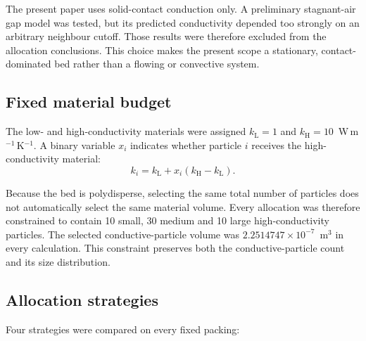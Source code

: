 \documentclass[12pt,a4paper]{article}
\begin{document}
	The present paper uses solid-contact conduction only. A preliminary stagnant-air
	gap model was tested, but its predicted conductivity depended too strongly on
	an arbitrary neighbour cutoff. Those results were therefore excluded from the
	allocation conclusions. This choice makes the present scope a stationary,
	contact-dominated bed rather than a flowing or convective system.
	
	\subsection{Fixed material budget}
	
	The low- and high-conductivity materials were assigned
	$k_{\mathrm L}=1$ and $k_{\mathrm H}=10$~W\,m$^{-1}$\,K$^{-1}$. A binary
	variable $x_i$ indicates whether particle $i$ receives the high-conductivity
	material:
	\begin{equation}
		k_i=k_{\mathrm L}+x_i(k_{\mathrm H}-k_{\mathrm L}).
	\end{equation}
	
	Because the bed is polydisperse, selecting the same total number of particles
	does not automatically select the same material volume. Every allocation was
	therefore constrained to contain 10 small, 30 medium and 10 large
	high-conductivity particles. The selected conductive-particle volume was
	$2.2514747\times10^{-7}$~m$^3$ in every calculation. This constraint preserves
	both the conductive-particle count and its size distribution.
	
	\subsection{Allocation strategies}
	
	Four strategies were compared on every fixed packing:
	
\end{document}
